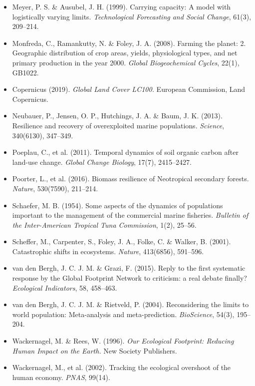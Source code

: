 \documentclass[11pt]{article}
\begin{document}
\begin{itemize}
\item Meyer, P. S. \& Ausubel, J. H. (1999). Carrying capacity: A model with logistically varying limits. \emph{Technological Forecasting and Social Change}, 61(3), 209--214.
\item Monfreda, C., Ramankutty, N. \& Foley, J. A. (2008). Farming the planet: 2. Geographic distribution of crop areas, yields, physiological types, and net primary production in the year 2000. \emph{Global Biogeochemical Cycles}, 22(1), GB1022.
\item Copernicus (2019). \emph{Global Land Cover LC100.} European Commission, Land Copernicus.
\item Neubauer, P., Jensen, O. P., Hutchings, J. A. \& Baum, J. K. (2013). Resilience and recovery of overexploited marine populations. \emph{Science}, 340(6130), 347--349.
\item Poeplau, C., et al. (2011). Temporal dynamics of soil organic carbon after land-use change. \emph{Global Change Biology}, 17(7), 2415--2427.
\item Poorter, L., et al. (2016). Biomass resilience of Neotropical secondary forests. \emph{Nature}, 530(7590), 211--214.
\item Schaefer, M. B. (1954). Some aspects of the dynamics of populations important to the management of the commercial marine fisheries. \emph{Bulletin of the Inter-American Tropical Tuna Commission}, 1(2), 25--56.
\item Scheffer, M., Carpenter, S., Foley, J. A., Folke, C. \& Walker, B. (2001). Catastrophic shifts in ecosystems. \emph{Nature}, 413(6856), 591--596.
\item van den Bergh, J. C. J. M. \& Grazi, F. (2015). Reply to the first systematic response by the Global Footprint Network to criticism: a real debate finally? \emph{Ecological Indicators}, 58, 458--463.
\item van den Bergh, J. C. J. M. \& Rietveld, P. (2004). Reconsidering the limits to world population: Meta-analysis and meta-prediction. \emph{BioScience}, 54(3), 195--204.
\item Wackernagel, M. \& Rees, W. (1996). \emph{Our Ecological Footprint: Reducing Human Impact on the Earth.} New Society Publishers.
\item Wackernagel, M., et al. (2002). Tracking the ecological overshoot of the human economy. \emph{PNAS}, 99(14).
\end{itemize}
\end{document}
